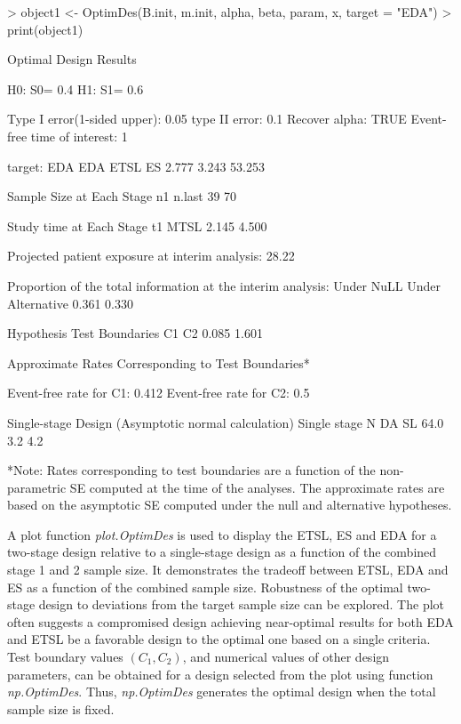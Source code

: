 \documentclass[12pt]{article}
\begin{document}
\begin{Schunk}
\begin{Sinput}
> object1 <- OptimDes(B.init, m.init, alpha, beta, param, x, target = "EDA")
> print(object1)
\end{Sinput}
\begin{Soutput}
             Optimal Design Results

    H0: S0= 0.4 H1: S1= 0.6

    Type I error(1-sided upper): 0.05 type II error: 0.1
    Recover alpha: TRUE
    Event-free time of interest: 1

                  target: EDA
          EDA          ETSL            ES
        2.777         3.243        53.253

          Sample Size at Each Stage
              n1           n.last
              39               70

          Study time at Each Stage
               t1              MTSL
            2.145             4.500

    Projected patient exposure at interim analysis:  28.22

    Proportion of the total information at the interim analysis:
           Under NuLL     Under Alternative
                0.361                 0.330


          Hypothesis Test Boundaries
               C1                C2
            0.085             1.601


    Approximate Rates Corresponding to Test Boundaries*

          Event-free rate for C1:  0.412
          Event-free rate for C2:  0.5


    Single-stage Design (Asymptotic normal calculation)
      Single stage N                   DA                   SL
                64.0                  3.2                  4.2


 *Note:  Rates corresponding to test boundaries are a function
 of the non-parametric SE computed at the time of the analyses.
 The approximate rates are based on the asymptotic SE computed
 under the null and alternative hypotheses.
\end{Soutput}
\end{Schunk}

A plot function {\it plot.OptimDes} is used to display the ETSL, ES and EDA for a two-stage design relative to a
single-stage design as a function of the combined stage 1 and 2 sample size. It demonstrates the tradeoff between
ETSL, EDA and ES as a function of the combined sample size. Robustness of the optimal two-stage design to deviations
from the target sample size can be explored. The plot often suggests a compromised design achieving near-optimal results
for both EDA and ETSL be a favorable design to the optimal one based on a single criteria.
Test boundary values $(C_1, C_2)$,
and numerical values of other design parameters, can be obtained for a design selected from the plot using function
{\it np.OptimDes}. Thus, {\it np.OptimDes} generates the optimal design when the total sample size is fixed.
\end{document}
